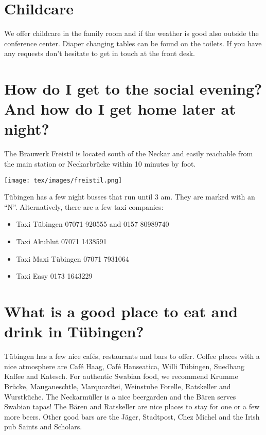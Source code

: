 \section*{Childcare}

We offer childcare in the family room and if the weather is good also outside the conference center. Diaper changing tables can be found on the toilets. If you have any requests don't hesitate to get in touch at the front desk. 

\section*{How do I get to the social evening? And how do I get home later at night?}

The Brauwerk Freistil is located south of the Neckar and easily reachable from the main station or Neckarbrücke within 10 minutes by foot.

\begin{center}
\texttt{[image: tex/images/freistil.png]}
\end{center}


Tübingen has a few night busses that run until 3 am. They are marked with an “N”. Alternatively, there are a few taxi companies:

\begin{itemize}
\setlength{\itemsep}{-0.8em} 
	\item Taxi Tübingen 07071 920555 and 0157 80989740
	\item Taxi Akublut 07071 1438591
	\item Taxi Maxi Tübingen 07071 7931064
	\item Taxi Easy 0173 1643229
\end{itemize}


\section*{What is a good place to eat and drink in Tübingen?}

Tübingen has a few nice cafés, restaurants and bars to offer. Coffee places with a nice atmosphere are Café Haag, Café Hanseatica, Willi Tübingen, Suedhang Kaffee and Katesch.
For authentic Swabian food, we recommend Krumme Brücke, Mauganeschtle, Marquardtei, Weinstube Forelle, Ratskeller and Wurstküche. The Neckarmüller is a nice beergarden and the Bären serves Swabian tapas! The Bären and Ratskeller are nice places to stay for one or a few more beers. Other good bars are the Jäger, Stadtpost, Chez Michel and the Irish pub Saints and Scholars.


